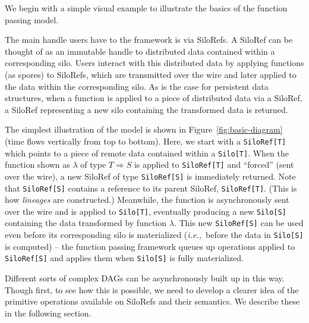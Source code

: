 \documentclass[10pt]{sigplanconf}
\theoremstyle{definition}
\theoremstyle{definition}
\newcommand{\ie}{{\em i.e.,~}}
\begin{document}
We begin with a simple visual example to illustrate the basics of
the function passing model.

The main handle users have to the framework is via SiloRefs. A SiloRef can be
thought of as an immutable handle to distributed data contained within a
corresponding silo. Users interact with this distributed data by applying
functions (as spores) to SiloRefs, which are transmitted over the wire and later
applied to the data within the corresponding silo. As is the case for persistent
data structures, when a function is applied to a piece of distributed data via a
SiloRef, a SiloRef representing a new silo containing the transformed data is
returned.

The simplest illustration of the model is shown in
Figure~\ref{fig:basic-diagram} (time flows vertically from top to bottom).
Here, we start with a \verb|SiloRef[T]| which points to a piece of remote data
contained within a \verb|Silo[T]|. When the function shown as $\lambda$ of type
$T \Rightarrow S$ is applied to \verb|SiloRef[T]| and ``forced'' (sent over the
wire), a new SiloRef of type \verb|SiloRef[S]| is immediately returned. Note
that \verb|SiloRef[S]| contains a reference to its parent SiloRef,
\verb|SiloRef[T]|. (This is how {\em lineages} are constructed.) Meanwhile, the
function is asynchronously sent over the wire and is applied to \verb|Silo[T]|,
eventually producing a new \verb|Silo[S]| containing the data transformed by
function $\lambda$. This new \verb|SiloRef[S]| can be used even before its
corresponding silo is materialized (\ie before the data in \verb|Silo[S]| is
computed) – the function passing framework queues up operations applied to \verb|SiloRef[S]|
and applies them when \verb|Silo[S]| is fully materialized.

Different sorts of complex DAGs can be asynchronously built up in this way.
Though first, to see how this is possible, we need to develop a clearer idea of
the primitive operations available on SiloRefs and their semantics. We describe
these in the following section.
\end{document}
